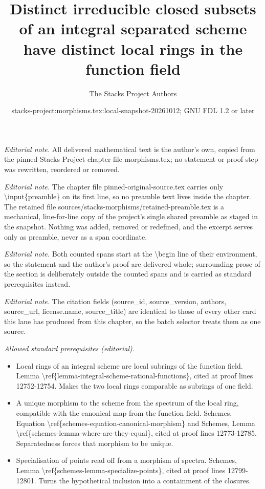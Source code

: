 \documentclass[10pt,a4paper]{amsart}
\title{Distinct irreducible closed subsets of an integral separated scheme have distinct local rings in the function field}
\author{The Stacks Project Authors}
\date{stacks-project:morphisms.tex:local-snapshot-20261012; GNU FDL 1.2 or later}
\theoremstyle{plain}
\theoremstyle{definition}
\theoremstyle{remark}
\numberwithin{equation}{subsection}
\begin{document}
\maketitle
\setcounter{subsection}{1}
\noindent\textit{Editorial note.} All delivered mathematical text is the author's own, copied from the pinned Stacks Project chapter file morphisms.tex; no statement or proof step was rewritten, reordered or removed.\par\medskip
\noindent\textit{Editorial note.} The chapter file pinned-original-source.tex carries only \textbackslash{}input\{preamble\} on its first line, so no preamble text lives inside the chapter. The retained file sources/stacks-morphisms/retained-preamble.tex is a mechanical, line-for-line copy of the project's single shared preamble as staged in the snapshot. Nothing was added, removed or redefined, and the excerpt serves only as preamble, never as a span coordinate.\par\medskip
\noindent\textit{Editorial note.} Both counted spans start at the \textbackslash{}begin line of their environment, so the statement and the author's proof are delivered whole; surrounding prose of the section is deliberately outside the counted spans and is carried as standard prerequisites instead.\par\medskip
\noindent\textit{Editorial note.} The citation fields (source\_id, source\_version, authors, source\_url, license.name, source\_title) are identical to those of every other card this lane has produced from this chapter, so the batch selector treats them as one source.\par\medskip
\noindent\textit{Allowed standard prerequisites (editorial).}\begin{itemize}
\item Local rings of an integral scheme are local subrings of the function field. Lemma \textbackslash{}ref\{lemma-integral-scheme-rational-functions\}, cited at proof lines 12752-12754. Makes the two local rings comparable as subrings of one field.
\item A unique morphism to the scheme from the spectrum of the local ring, compatible with the canonical map from the function field. Schemes, Equation \textbackslash{}ref\{schemes-equation-canonical-morphism\} and Schemes, Lemma \textbackslash{}ref\{schemes-lemma-where-are-they-equal\}, cited at proof lines 12773-12785. Separatedness forces that morphism to be unique.
\item Specialisation of points read off from a morphism of spectra. Schemes, Lemma \textbackslash{}ref\{schemes-lemma-specialize-points\}, cited at proof lines 12799-12801. Turns the hypothetical inclusion into a containment of the closures.
\end{itemize}\medskip
\end{document}
